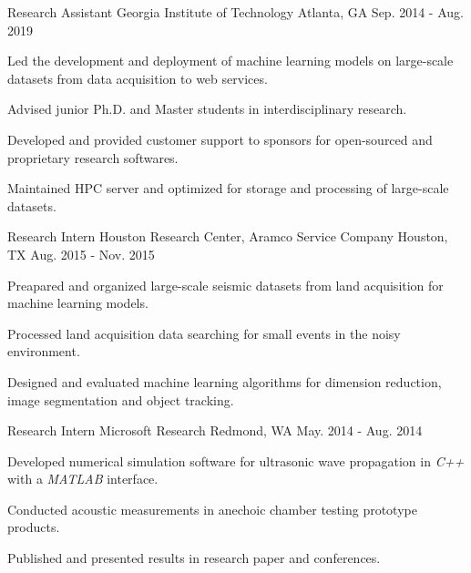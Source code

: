 \begin{cventries}
	\cventry
		{Research Assistant} %
		{Georgia Institute of Technology} %
		{Atlanta, GA} %
		{Sep. 2014 - Aug. 2019} %
		{
			\begin{cvitems} %
				\item {Led the development and deployment of machine learning models on large-scale datasets from data acquisition to web services.}
				\item {Advised junior Ph.D. and Master students in interdisciplinary research.}
				\item {Developed and provided customer support to sponsors for open-sourced and proprietary research softwares.}
				\item {Maintained HPC server and optimized for storage and processing of large-scale datasets.}
			\end{cvitems}
		}


	\cventry
		{Research Intern} %
		{Houston Research Center, Aramco Service Company} %
		{Houston, TX} %
		{Aug. 2015 - Nov. 2015} %
		{
			\begin{cvitems} %
			\item {Preapared and organized large-scale seismic datasets from land acquisition for machine learning models.}
				\item {Processed land acquisition data searching for small events in the noisy environment.}
				\item {Designed and evaluated machine learning algorithms for dimension reduction, image segmentation and object tracking.}
			\end{cvitems}
		}

	\cventry
		{Research Intern} %
		{Microsoft Research} %
		{Redmond, WA} %
		{May. 2014 - Aug. 2014} %
		{
			\begin{cvitems} %
				\item {Developed numerical simulation software for ultrasonic wave propagation in \textit{C++} with a \textit{MATLAB} interface.}
				\item {Conducted acoustic measurements in anechoic chamber testing prototype products.}
				\item {Published and presented results in research paper and conferences.}
			\end{cvitems}
		}


\end{cventries}
